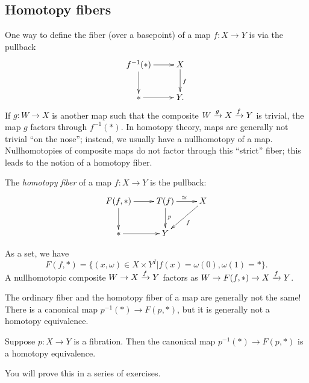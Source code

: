 \subsection{Homotopy fibers}
One way to define the fiber (over a basepoint) of a map $f:X \to Y$ is via the pullback
\begin{equation*}
    \xymatrix{
	f^{-1}(\ast)\ar[r]\ar[d] & X\ar[d]^f\\
	\ast\ar[r] & Y.
    }
\end{equation*}
If $g:W \to X$ is another map such that the composite $W\xrightarrow{{g}} X\xrightarrow{{f}} Y$ is trivial, the map $g$ factors through $f^{-1}(\ast)$.
In homotopy theory, maps are generally not trivial ``on the nose''; instead, we usually have a nullhomotopy of a map.
Nullhomotopies of composite maps do not factor through this ``strict'' fiber; this leads to the notion of a homotopy fiber.
\begin{definition}
    The \emph{homotopy fiber} of a map $f:X\to Y$ is the pullback:
    \begin{equation*}
	\xymatrix{
	    F(f,\ast)\ar[r]\ar[d] & T(f)\ar[r]^\simeq \ar[d]^p & X\ar[dl]^f\\
	    \ast \ar[r] & Y &
	    }
    \end{equation*}
\end{definition}
As a set, we have
\begin{equation}\label{sethomotopyfiber}
    F(f,\ast) = \{(x,\omega)\in X\times Y^I| f(x) = \omega(0), \omega(1) = \ast\}.
\end{equation}
A nullhomotopic composite $W\to X\xrightarrow{{f}} Y$ factors as $W\to F(f,\ast)\to X\xrightarrow{{f}} Y$.
\begin{warning}
    The ordinary fiber and the homotopy fiber of a map are generally not the same!
    There is a canonical map $p^{-1}(\ast) \to F(p,\ast)$, but it is generally not a homotopy equivalence.
\end{warning}
\begin{prop}\label{strictcomparison}
    Suppose $p:X\to Y$ is a fibration.
    Then the canonical map $p^{-1}(\ast)\to F(p,\ast)$ is a homotopy equivalence.
\end{prop}
You will prove this in a series of exercises.

